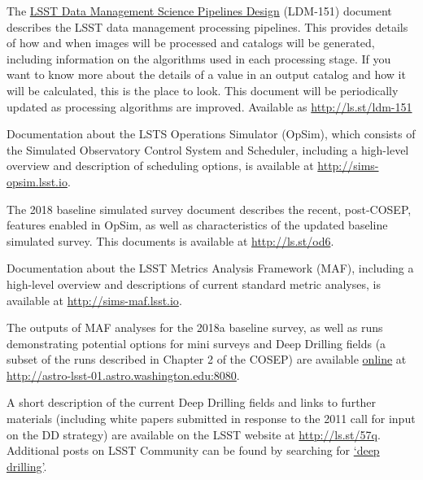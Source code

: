 \documentclass[DM,lsstdraft,toc,usenatbib]{lsstdoc}
\begin{document}
The \href{http://ls.st/ldm-151}{LSST Data Management Science Pipelines Design} (LDM-151) document describes the LSST data management processing pipelines. This provides details of how and when images will be processed and catalogs will be generated, including information on the algorithms used in each processing stage. If you want to know more about the details of a value in an output catalog and how it will be calculated, this is the place to look. This document will be periodically updated as processing algorithms are improved. Available as \url{http://ls.st/ldm-151}


Documentation about the LSTS Operations Simulator (OpSim), which consists of the Simulated Observatory Control System and 
Scheduler, including a high-level overview and description of scheduling options, is available at \url{http://sims-opsim.lsst.io}.

The 2018 baseline simulated survey document describes the recent, post-COSEP, features enabled in OpSim, as well 
as characteristics of the updated baseline simulated survey. This documents is available at \url{http://ls.st/od6}.

Documentation about the LSST Metrics Analysis Framework (MAF), including a high-level overview and descriptions of current standard metric analyses, is available at \url{http://sims-maf.lsst.io}. 

The outputs of MAF analyses for the 2018a baseline survey, as well as runs demonstrating potential options for mini surveys and Deep 
Drilling fields (a subset of the runs described in Chapter 2 of the COSEP) are available \href{http://astro-lsst-01.astro.washington.edu:8080}{online} at \url{http://astro-lsst-01.astro.washington.edu:8080}. 

A short description of the current Deep Drilling fields and links to further materials (including white papers submitted in response to the 2011 call for input on the DD strategy) are available on the LSST website at \href{https://www.lsst.org/scientists/survey-design/ddf}{http://ls.st/57q}. Additional posts on LSST Community can be found by searching for \href{https://community.lsst.org/search?q=deep%20drilling}{`deep drilling'}. 
\end{document}
